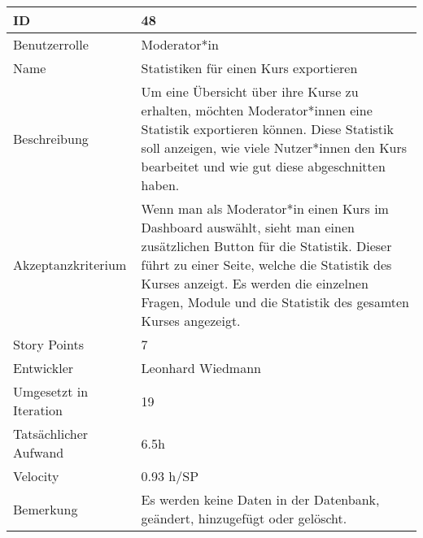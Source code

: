 \begin{tabularx}{\textwidth}{|p{}|X|}
	\hline
	ID & 48\\
	\hline
	Benutzerrolle & Moderator*in\\
	\hline
	Name & Statistiken für einen Kurs exportieren\\
	\hline
	Beschreibung & Um eine Übersicht über ihre Kurse zu erhalten, möchten Moderator*innen eine Statistik exportieren können. Diese Statistik soll anzeigen, wie viele Nutzer*innen den Kurs bearbeitet und wie gut diese abgeschnitten haben.\\
	\hline
	Akzeptanzkriterium & Wenn man als Moderator*in einen Kurs im Dashboard auswählt, sieht man einen zusätzlichen Button für die Statistik. Dieser führt zu einer Seite, welche die Statistik des Kurses anzeigt. Es werden die einzelnen Fragen, Module und die Statistik des gesamten Kurses angezeigt.\\
	\hline
	Story Points & 7\\
	\hline
	Entwickler & Leonhard Wiedmann\\
	\hline
	Umgesetzt in Iteration & 19\\
	\hline
	Tatsächlicher Aufwand & 6.5h \\
	\hline
	Velocity & 0.93 h/SP\\
	\hline
	Bemerkung & Es werden keine Daten in der Datenbank, geändert, hinzugefügt oder gelöscht.\\
	\hline
\end{tabularx}
\vspace{20pt}
